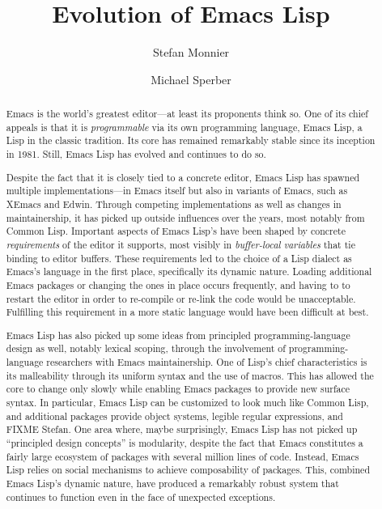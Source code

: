 \documentclass[format=acmsmall, review=false, screen=true]{acmart}
\begin{document}
\title{Evolution of Emacs Lisp}

\author{Stefan Monnier}
\author{Michael Sperber}


\begin{abstract}
  Emacs is the world's greatest editor---at least its proponents think
  so.  One of its chief appeals is that it is \emph{programmable} via
  its own programming language, Emacs Lisp, a Lisp in the classic
  tradition.  Its core has remained remarkably stable since its
  inception in 1981.  Still, Emacs Lisp has evolved and continues to
  do so.

  Despite the fact that it is closely tied to a concrete editor, Emacs
  Lisp has spawned multiple implementations---in Emacs itself but also
  in variants of Emacs, such as XEmacs and Edwin.  Through competing
  implementations as well as changes in maintainership, it has picked
  up outside influences over the years, most notably from Common Lisp.
  Important aspects of Emacs Lisp's  have been shaped by
  concrete \emph{requirements} of the editor it supports, most
  visibly in \textit{buffer-local variables} that tie binding to
  editor buffers.
  These requirements led to the choice of a Lisp dialect as Emacs's
  language in the first place, specifically its dynamic nature.
  Loading additional Emacs packages or changing the ones in place
  occurs frequently, and having to to restart the editor in order to
  re-compile or re-link the code would be unacceptable.  Fulfilling
  this requirement in a more static language would have been difficult
  at best.

  Emacs Lisp has also picked up some ideas from principled
  programming-language design as well, notably lexical scoping,
  through the involvement of programming-language researchers with
  Emacs maintainership.
  One of Lisp's chief characteristics is its malleability through its
  uniform syntax and the use of macros.  This has allowed the core to
  change only slowly while enabling Emacs packages to provide new
  surface syntax.  In particular, Emacs Lisp can be customized to look
  much like Common Lisp, and additional packages provide object
  systems, legible regular expressions, and FIXME Stefan.
  One area where, maybe surprisingly, Emacs Lisp has not picked up
  "`principled design concepts"' is modularity, despite the fact that
  Emacs constitutes a fairly large ecosystem of packages with several
  million lines of code.  Instead, Emacs Lisp relies on social
  mechanisms to achieve composability of packages. This, combined
  Emacs Lisp's dynamic nature, have produced a remarkably robust
  system that continues to function even in the face of unexpected
  exceptions.


\end{abstract}
\end{document}
